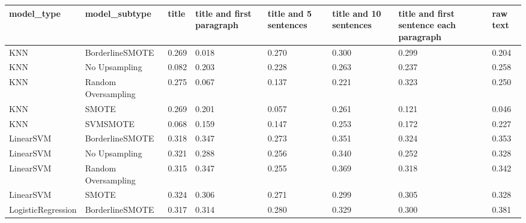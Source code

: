 \begin{tabular}{llllllll}
\toprule
                  model\_type &       model\_subtype & title & title and first paragraph & title and 5 sentences & title and 10 sentences & title and first sentence each paragraph &  raw text \\
\midrule
                         KNN &     BorderlineSMOTE & 0.269 &                     0.018 &                 0.270 &                  0.300 &                                   0.299 &     0.204 \\
                         KNN &       No Upsampling & 0.082 &                     0.203 &                 0.228 &                  0.263 &                                   0.237 &     0.258 \\
                         KNN & Random Oversampling & 0.275 &                     0.067 &                 0.137 &                  0.221 &                                   0.323 &     0.250 \\
                         KNN &               SMOTE & 0.269 &                     0.201 &                 0.057 &                  0.261 &                                   0.121 &     0.046 \\
                         KNN &            SVMSMOTE & 0.068 &                     0.159 &                 0.147 &                  0.253 &                                   0.172 &     0.227 \\
                   LinearSVM &     BorderlineSMOTE & 0.318 &                     0.347 &                 0.273 &                  0.351 &                                   0.324 &     0.353 \\
                   LinearSVM &       No Upsampling & 0.321 &                     0.288 &                 0.256 &                  0.340 &                                   0.252 &     0.328 \\
                   LinearSVM & Random Oversampling & 0.315 &                     0.347 &                 0.255 &                  0.369 &                                   0.318 &     0.342 \\
                   LinearSVM &               SMOTE & 0.324 &                     0.306 &                 0.271 &                  0.299 &                                   0.305 &     0.328 \\
          LogisticRegression &     BorderlineSMOTE & 0.317 &                     0.314 &                 0.280 &                  0.329 &                                   0.300 &     0.381 \\

\end{tabular}
